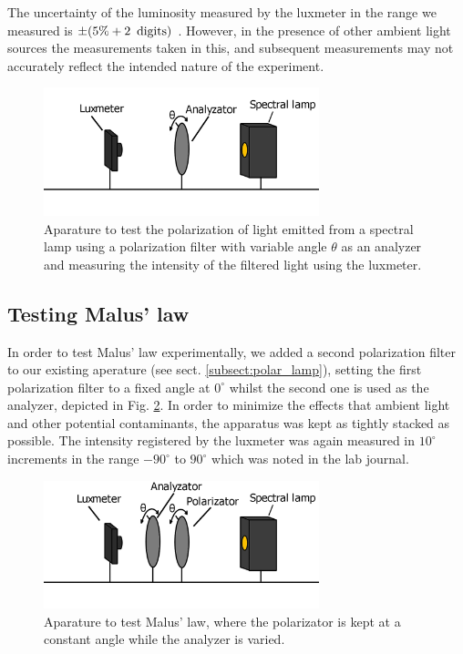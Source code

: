 \documentclass[11pt,a4paper]{article}
\begin{document}
    The uncertainty of the luminosity measured by the luxmeter in the range we measured is $\pm (5\% + 2\enspace \textup{digits})$ \cite{data:luxmeter}. However, in the presence of other ambient light sources the measurements taken in this, and subsequent measurements may not accurately reflect the intended nature of the experiment.


  \begin{figure}[H]
    \center
    \includegraphics[width=8cm]{scripts/figs/diagram_1.png}
    \caption{Aparature to test the polarization of light emitted from a spectral lamp using a polarization filter with variable angle $\theta$ as an analyzer and measuring the intensity of the filtered light using the luxmeter.}
    \label{fig:lux_ana_lamp}
  \end{figure}

  \subsection{Testing Malus' law}

    In order to test Malus' law experimentally, we added a second polarization filter to our existing aperature (see sect. \ref{subsect:polar_lamp}), setting the first polarization filter to a fixed angle at $0^\circ$ whilst the second one is used as the analyzer, depicted in Fig. \ref{fig:lux_ana_pola_lamp}. In order to minimize the effects that ambient light and other potential contaminants, the apparatus was kept as tightly stacked as possible. The intensity registered by the luxmeter was again measured in $10^\circ$ increments in the range $-90^\circ$ to $90^\circ$ which was noted in the lab journal. 

    \begin{figure}[H]
      \center
      \includegraphics[width=8cm]{scripts/figs/diagram_2.png}
      \caption{Aparature to test Malus' law, where the polarizator is kept at a constant angle while the analyzer is varied.}
      \label{fig:lux_ana_pola_lamp}
    \end{figure}
\end{document}
